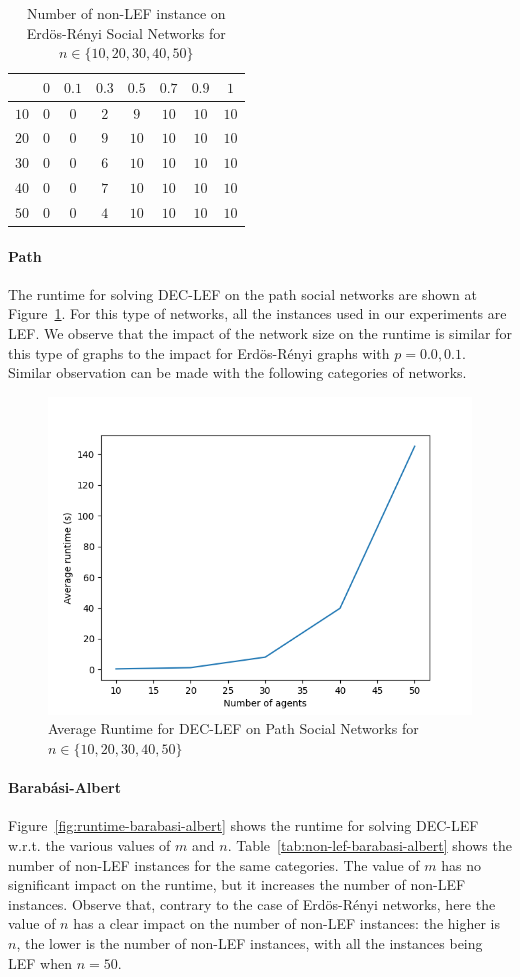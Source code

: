 \documentclass{article}
\begin{document}
\begin{table}[htb]
\centering
\begin{tabular}{|c|c|c|c|c|c|c|c|}
	\hline
	\backslashbox{$n$}{$p$} & $0$ & $0.1$ & $0.3$ & $0.5$ & $0.7$ & $0.9$ & $1$ \\ \hline
	$10$ & $0$ & $0$ & $2$ & $9$ & $10$ & $10$ & $10$ \\
	$20$ & $0$ & $0$ & $9$ & $10$ & $10$ & $10$ & $10$ \\
	$30$ & $0$ & $0$ & $6$ & $10$ & $10$ & $10$ & $10$ \\
	$40$ & $0$ & $0$ & $7$ & $10$ & $10$ & $10$ & $10$ \\
	$50$ & $0$ & $0$ & $4$ & $10$ & $10$ & $10$ & $10$ \\
	\hline
\end{tabular}
\caption{Number of non-LEF instance on Erd\"os-R\'enyi Social Networks for $n \in \{10,20,30,40,50\}$\label{tab:non-lef-erdos-renyi}}
\end{table}

\paragraph{Path} The runtime for solving DEC-LEF on the path social networks are shown at Figure~\ref{fig:runtime-path}. For this type of networks, all the instances used in our experiments are LEF. We observe that the impact of the network size on the runtime is similar for this type of graphs to the impact for Erd\"os-R\'enyi graphs with $p = 0.0, 0.1$. Similar observation can be made with the following categories of networks.

\begin{figure}[htb]
\centering
\includegraphics[width=0.45\linewidth]{results-runtime-path.png}
\caption{Average Runtime for DEC-LEF on Path Social Networks for $n \in \{10,20,30,40,50\}$\label{fig:runtime-path}}
\end{figure}

\paragraph{Barab\'asi-Albert} Figure~\ref{fig:runtime-barabasi-albert} shows the runtime for solving DEC-LEF w.r.t. the various values of  $m$ and $n$. Table~\ref{tab:non-lef-barabasi-albert} shows the number of non-LEF instances for the same categories. The value of $m$ has no significant impact on the runtime, but it increases the number of non-LEF instances. Observe that, contrary to the case of Erd\"os-R\'enyi networks, here the value of $n$ has a clear impact on the number of non-LEF instances: the higher is $n$, the lower is the number of non-LEF instances, with all the instances being LEF when $n=50$.
\end{document}
